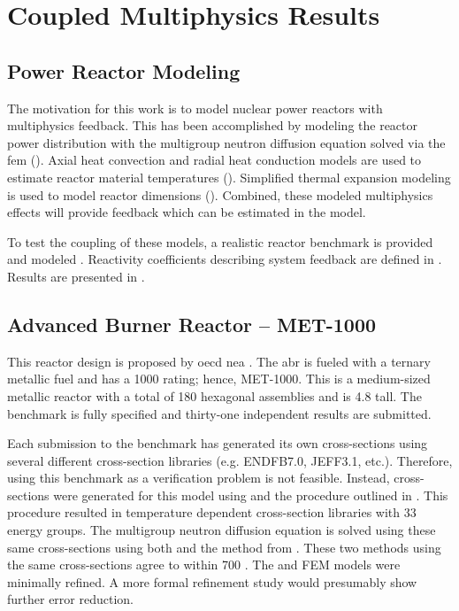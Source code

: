 \chapter{Coupled Multiphysics Results}
\label{ch:coupledResults}

\section{Power Reactor Modeling}
\label{sec:power_reactor_modeling}
  The motivation for this work is to model nuclear power reactors with
  multiphysics feedback. This has been accomplished by modeling the reactor 
  power distribution with the multigroup neutron diffusion equation solved via 
  the \gls{fem} (). Axial heat
  convection and radial heat conduction models are used to estimate reactor
  material temperatures ().
  Simplified thermal expansion modeling is used to model reactor dimensions 
  (). Combined, these modeled multiphysics effects 
  will provide feedback which can be estimated in the model. 
  
  To test the coupling of these models, a realistic reactor benchmark is 
  provided and modeled . Reactivity coefficients describing system 
  feedback are defined in . Results are 
  presented in .

\section{Advanced Burner Reactor -- MET-1000}
\label{sec:abr}
  This reactor design is proposed by \gls{oecd} \gls{nea} \cite{abr}. The 
  \gls{abr} is fueled with a ternary metallic fuel and has a 1000
   rating; hence, MET-1000. This is a medium-sized metallic reactor 
  with a total of 180 hexagonal assemblies and is 4.8  tall. The 
  benchmark is fully specified and thirty-one independent results are submitted. 
  
  Each submission to the benchmark has generated its own cross-sections using 
  several different cross-section libraries (e.g. ENDFB7.0, JEFF3.1, etc.). 
  Therefore, using this benchmark as a verification problem is not feasible.
  Instead, cross-sections were generated for this model using \mcc and the
  procedure outlined in . This procedure 
  resulted  in temperature dependent cross-section libraries with 33 energy 
  groups. The  multigroup neutron diffusion equation is solved using these same
  cross-sections using both \dif and the method from 
  .  These two methods using the same cross-sections 
  agree to within 700 . The \dif and FEM models were minimally 
  refined. A more formal refinement study would presumably show further error 
  reduction.

